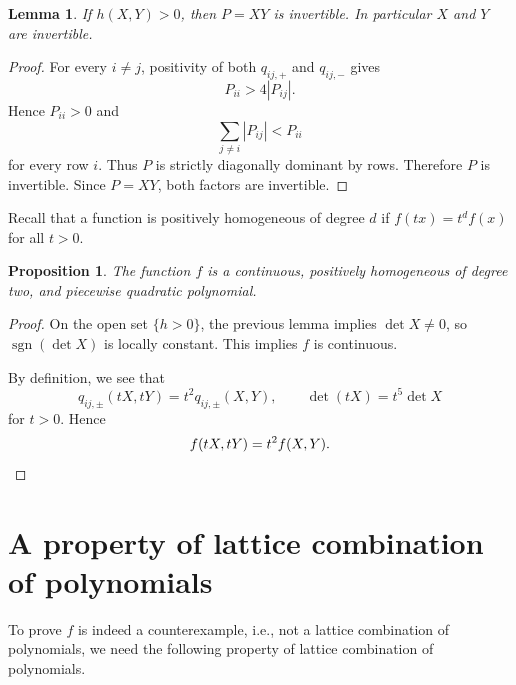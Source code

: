 \documentclass[11pt]{amsart}
\newtheorem{proposition}[theorem]{Proposition}
\newtheorem{lemma}[theorem]{Lemma}
\theoremstyle{remark}
\DeclareMathOperator{\sgn}{sgn}
\begin{document}
\begin{lemma}
If $h(X,Y)>0$, then $P=XY$ is invertible. In particular $X$ and $Y$ are invertible.
\end{lemma}
\begin{proof}
For every $i\ne j$, positivity of both $q_{ij,+}$ and $q_{ij,-}$ gives
\[
P_{ii}>4|P_{ij}|.
\]
Hence $P_{ii}>0$ and
\[
\sum_{j\ne i}|P_{ij}|<P_{ii}
\]
for every row $i$. Thus $P$ is strictly diagonally dominant by rows. Therefore $P$ is invertible. Since $P=XY$, both factors are invertible.
\end{proof}

Recall that a function is positively homogeneous of degree $d$ if $f(t x) = t^d f(x)$ for all $t > 0$.
\begin{proposition}
The function $f$ is a continuous, positively homogeneous of degree two, and piecewise quadratic polynomial.
\end{proposition}
\begin{proof}
On the open set $\{h>0\}$, the previous lemma implies $\det X\ne0$, so $\sgn(\det X)$ is locally constant. This implies $f$ is  continuous.

By definition, we see that
\[
q_{ij,\pm}(tX,tY)=t^2q_{ij,\pm}(X,Y),
\qquad
\det(tX)=t^5\det X
\]
for $t>0$. Hence
\[
f(tX,tY)=t^2f(X,Y). \qedhere
\]
\end{proof}

\section{A property of lattice combination of polynomials}

To prove $f$ is indeed a counterexample, i.e., not a lattice combination of polynomials, we need the following property of lattice combination of polynomials.
\end{document}
